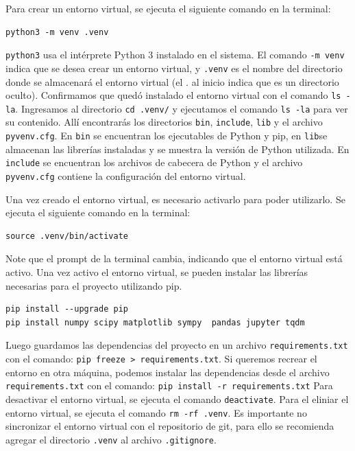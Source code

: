 \documentclass[12pt]{article}
\begin{document}
    Para crear un entorno virtual, se ejecuta el siguiente comando  en la terminal:
\begin{lstlisting}
python3 -m venv .venv  
\end{lstlisting}
	\lstinline|python3| usa el intérprete Python 3 instalado en el sistema. 
	El comando \lstinline|-m venv| indica que se desea crear un entorno 
	virtual, y \lstinline|.venv| es el nombre del directorio donde se 
	almacenará el entorno virtual (el . al inicio indica que es 
	un directorio oculto). Confirmamos que quedó instalado el entorno 
	virtual con el comando \lstinline|ls -la|.
	Ingresamos al directorio \lstinline|cd .venv/| y ejecutamos el comando \lstinline|ls -la| 
	para ver su contenido. Allí encontrarás los directorios \lstinline|bin|, \lstinline|include|, 
	\lstinline|lib| y el archivo \lstinline|pyvenv.cfg|. En \lstinline|bin| se encuentran los ejecutables 
	de Python y pip, en \lstinline|lib|se almacenan las librerías instaladas y se muestra la 
	versión de Python utilizada. En \lstinline|include| se encuentran los archivos de cabecera de Python 
	y el archivo \lstinline|pyvenv.cfg| contiene la configuración del entorno virtual.

	Una vez creado el entorno virtual, es necesario activarlo para poder utilizarlo.
	Se ejecuta el siguiente comando en la terminal:
\begin{lstlisting}
source .venv/bin/activate
\end{lstlisting}
	Note que el prompt de la terminal cambia, indicando que el entorno virtual está activo.
	Una vez activo el entorno virtual, se pueden instalar las librerías necesarias para el proyecto
	utilizando pip.
\begin{lstlisting}
pip install --upgrade pip
pip install numpy scipy matplotlib sympy  pandas jupyter tqdm
\end{lstlisting}
	Luego guardamos las dependencias del proyecto en un archivo \lstinline|requirements.txt| 
	con el comando: \lstinline|pip freeze > requirements.txt|. Si queremos recrear el entorno 
	en otra máquina, podemos instalar las dependencias desde el archivo 
	\lstinline|requirements.txt| con el comando: \lstinline|pip install -r requirements.txt|
	Para desactivar el entorno virtual, se ejecuta el comando \lstinline|deactivate|.
	Para el eliniar el entorno virtual, se ejecuta el comando \lstinline|rm -rf .venv|.
	{\color{blue} Es importante no sincronizar el entorno virtual con el repositorio de git, 
	para ello se recomienda agregar el directorio \lstinline|.venv| al archivo \lstinline|.gitignore|.}
\end{document}
